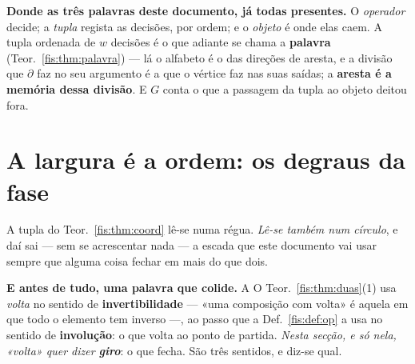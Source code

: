 \documentclass[livro.tex]{subfiles}
\begin{document}
\medskip\noindent\textbf{Donde as três palavras deste documento, já todas
presentes.} O \emph{operador} decide; a \emph{tupla} regista as decisões, por
ordem; e o \emph{objeto} é onde elas caem. A tupla ordenada de $w$ decisões é o
que adiante se chama a \textbf{palavra} (Teor.~\ref{fis:thm:palavra}) --- lá o
alfabeto é o das direções de aresta, e a divisão que $\partial$ faz no seu
argumento é a que o vértice faz nas suas saídas; a \textbf{aresta é a memória
dessa divisão}. E $G$ conta o que a passagem da tupla ao objeto deitou fora.


\section{A largura é a ordem: os degraus da fase}\label{fis:largura}

\noindent A tupla do Teor.~\ref{fis:thm:coord} lê-se numa régua. \emph{Lê-se
também num círculo}, e daí sai --- sem se acrescentar nada --- a escada que este
documento vai usar sempre que alguma coisa fechar em mais do que dois.

\medskip\noindent\textbf{E antes de tudo, uma palavra que colide.} A
O Teor.~\ref{fis:thm:duas}(1) usa \emph{volta} no
sentido de \textbf{invertibilidade} --- «uma composição com volta» é aquela em
que todo o elemento tem inverso ---, ao passo que a Def.~\ref{fis:def:op} a usa no
sentido de \textbf{involução}: o que volta ao ponto de partida. \emph{Nesta secção,
e só nela, «volta» quer dizer \textbf{giro}}: o que fecha. São três sentidos, e
diz-se qual.
\end{document}
